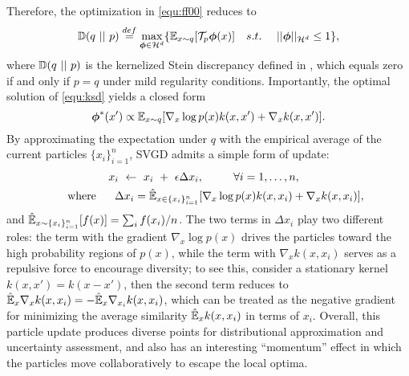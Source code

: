 \documentclass{article} %
\begin{document}
Therefore, the optimization in \eqref{equ:ff00} reduces to 
\begin{align}\label{equ:ksd}
\S(q ~||~ p) \overset{def}{=} \max_{\ff \in \H^d} \{ \E_{x\sim q} [\sumstein_p \ff(x)]  ~~~s.t.~~~~ ||\ff ||_{\H^d} \leq 1\}, 
\end{align}
where $\S(q ~||~ p)$ is the kernelized Stein discrepancy defined in \citet{liu2016kernelized}, which equals zero if and only if $p = q$ under mild regularity conditions. 
Importantly, the optimal solution of \eqref{equ:ksd} yields a closed form%
$$
\ff^*(x') \propto  \E_{x\sim q}[\nabla_x \log p(x)k(x,x') + \nabla_x k(x,x')]. 
$$
By approximating the expectation under $q$ with the empirical average of the current particles $
\{x_i\}_{i=1}^n$,  SVGD admits a simple form of update: 
\begin{align}\label{equ:update11}
&& &~~~~~~~~~~~ x_i ~ \gets ~ x_i  ~  + ~ \epsilon \Delta x_i, 
~~~~~~~~\forall i = 1, \ldots, n,  \notag
\\
~
&&& \text{where~~~~~}\Delta x_i = \hat \E_{x\in \{x_i\}_{i=1}^n} [  \nabla_{x} \log p(x) k(x, x_i) + \nabla_{x} k(x, x_i) ], 
\end{align}
and $\hat\E_{x\sim \{x_i\}_{i=1}^n}[f(x)] = \sum_i f(x_i)/n$. 
The two terms in $\Delta x_i$ play two different roles: 
the term with the gradient $\nabla_x \log p(x)$ drives the particles toward the high probability regions of $p(x)$, 
while the term with $\nabla_x k(x,x_i)$ serves as a repulsive force to encourage diversity;
to see this, consider a stationary kernel $k(x,x') = k(x-x')$, then the second term reduces to $\hat \E_x \nabla_{x} k(x,x_i) = - \hat \E_x \nabla_{x_i} k(x,x_i)$, 
which can be treated as the negative gradient for minimizing the average similarity $\hat \E_x k(x,x_i)$ in terms of $x_i$. 
Overall, this particle update produces diverse points for distributional approximation and uncertainty assessment, and 
also has an interesting ``momentum'' effect in which the particles move collaboratively to escape the local optima.
\end{document}

